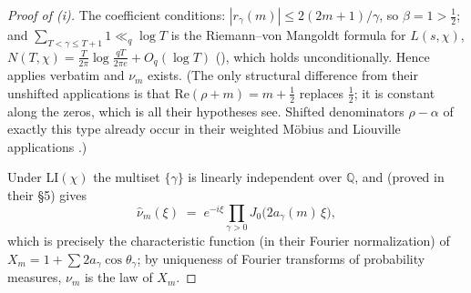 \documentclass[11pt]{article}
\begin{document}
\begin{proof}[Proof of (i)]
The coefficient conditions: $|r_\gamma(m)|\le2(2m+1)/\gamma$, so
$\beta=1>\tfrac12$; and $\sum_{T<\gamma\le T+1}1\ll_q\log T$ is the
Riemann--von Mangoldt formula for $L(s,\chi)$,
$N(T,\chi)=\frac{T}{2\pi}\log\frac{qT}{2\pi e}+O_q(\log T)$
(\cite[\S16]{Dav00}), which holds unconditionally. Hence
\cite[Cor.~1.3(a)]{ANS14} applies verbatim and $\nu_m$ exists. (The
only structural difference from their unshifted applications is that
$\mathrm{Re}(\rho+m)=m+\tfrac12$ replaces $\tfrac12$; it is constant
along the zeros, which is all their hypotheses see. Shifted
denominators $\rho-\alpha$ of exactly this type already occur in their
weighted M\"obius and Liouville applications \cite[Lem.~4.3,
Cor.~1.6]{ANS14}.)

Under LI$(\chi)$ the multiset $\{\gamma\}$ is linearly independent
over $\mathbb Q$, and \cite[Thm.~1.9]{ANS14} (proved in their \S5)
gives
\[
\hat\nu_m(\xi)\;=\;e^{-i\xi}\prod_{\gamma>0}
J_0\bigl(2a_\gamma(m)\,\xi\bigr),
\]
which is precisely the characteristic function (in their Fourier
normalization) of $X_m=1+\sum2a_\gamma\cos\theta_\gamma$; by
uniqueness of Fourier transforms of probability measures, $\nu_m$ is
the law of $X_m$.
\end{proof}
\end{document}
